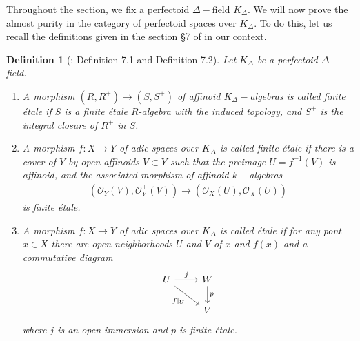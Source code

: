 \documentclass[12pts,a4paper]{amsart}
\newtheorem{definition}[proposition]{Definition}
\begin{document}
Throughout the section, we fix a perfectoid $\Delta-$field $K_\Delta$. We will now prove the almost purity in the category of perfectoid spaces over $K_\Delta$. To do this, let us recall the definitions given in the section \S7 of \cite{Sch} in our context. 

\begin{definition}[\cite{Sch}; Definition 7.1 and Definition 7.2]
    Let $K_\Delta$ be a perfectoid $\Delta-$field.
    \begin{enumerate}
        \item[(i)] A morphism $(R,R^+)\to (S,S^+)$ of affinoid $K_\Delta-$algebras is called \emph{finite \'etale} if $S$ is a finite \'etale $R$-algebra with the induced topology, and $S^+$ is the integral closure of $R^+$ in $S$.
        \item[(ii)] A morphism $f:X\to Y$ of adic spaces over $K_\Delta$ is called \emph{finite \'etale} if there is a cover of $Y$ by open affinoids $V\subset Y$ such that the preimage $U=f^{-1}(V)$ is affinoid, and the associated morphism of affinoid $k-$algebras
        \begin{align*}
            (\mathcal{O}_Y(V),\mathcal{O}^+_Y(V))\to (\mathcal{O}_X(U),\mathcal{O}^+_X(U))
        \end{align*}
        is finite \'etale.
        \item[(iii)] A morphism $f:X\to Y$ of adic spaces over $K_\Delta$ is called \'etale if for any pont $x\in X$ there are open neighborhoods $U$ and $V$ of $x$ and $f(x)$ and a commutative diagram
        \[
        \begin{tikzcd}
            U\arrow[r,"j"]\arrow[dr,swap,"f|_U"] & W\arrow[d,"p"]\\
                                            & V
        \end{tikzcd}
        \]
        where $j$ is an open immersion and $p$ is finite \'etale.
    \end{enumerate}
    \end{definition}
\end{document}

